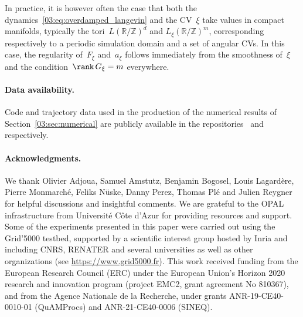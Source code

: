         In practice, it is however often the case that both the dynamics~\eqref{03:eq:overdamped_langevin} and the CV~$\xi$ take values in compact manifolds, typically the tori~$L(\mathbb R/\mathbb Z)^d$ and $L_\xi(\mathbb R/\mathbb Z)^m$, corresponding respectively to a periodic simulation domain and a set of angular CVs.
        In this case, the regularity of~$F_\xi$ and~$a_\xi$ follows immediately from the smoothness of~$\xi$ and the condition~$\rank\,G_\xi=m$ everywhere.

    \paragraph{Data availability.}
Code and trajectory data used in the production of the numerical results of Section~\ref{03:sec:numerical} are publicly available in the repositories~\cite{github} and~\cite{data} respectively.
\paragraph{Acknowledgments.}
    We thank Olivier Adjoua, Samuel Amstutz, Benjamin Bogosel, Louis Lagard\`ere, Pierre Monmarch\'e, Feliks N\"uske, Danny Perez, Thomas Pl\'e and Julien Reygner for helpful discussions and insightful comments.
    We are grateful to the OPAL infrastructure from Universit\'e C\^ote d'Azur for providing resources and support.
    Some of the experiments presented in this paper were carried out using the Grid'5000 testbed, supported by a scientific interest group hosted by Inria and including CNRS, RENATER and several universities as well as other organizations (see \url{https://www.grid5000.fr}).
    This work received funding from the European Research Council (ERC) under the
    European Union's Horizon 2020 research and innovation program (project
    EMC2, grant agreement No 810367), and from the Agence Nationale de la
    Recherche, under grants ANR-19-CE40-0010-01 (QuAMProcs) and
    ANR-21-CE40-0006 (SINEQ).